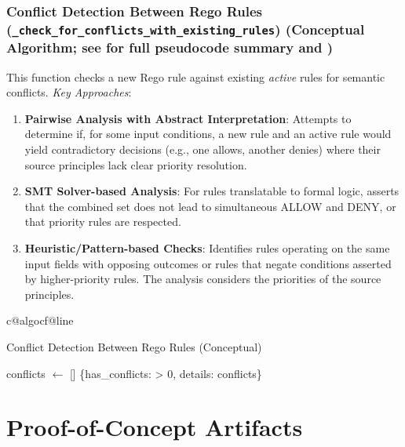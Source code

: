 \documentclass[sigconf,natbib]{acmart}
\makeatletter
\newcommand{\resetalglineno}{\setcounter{ALG@line}{0}}
\renewcommand{\resetalglineno}{%
  \setcounter{ALG@line}{0}%
  \ifcsname c@algocf@line\endcsname\setcounter{algocf@line}{0}\fi%
}
\makeatother
\begin{document}
\subsubsection[Conflict Detection Between Rego Rules]{Conflict Detection Between Rego Rules (\texttt{\_check\_for\_conflicts\_with\_existing\_rules}) (Conceptual Algorithm; see  for full pseudocode summary and )}
\label{app:conflict_detection_subsection}
This function checks a new Rego rule against existing \textit{active} rules for semantic conflicts. \textit{Key Approaches}:
\begin{enumerate}
    \item \textbf{Pairwise Analysis with Abstract Interpretation}: Attempts to determine if, for some input conditions, a new rule and an active rule would yield contradictory decisions (e.g., one allows, another denies) where their source principles lack clear priority resolution.
    \item \textbf{SMT Solver-based Analysis}: For rules translatable to formal logic, asserts that the combined set does not lead to simultaneous ALLOW and DENY, or that priority rules are respected.
    \item \textbf{Heuristic/Pattern-based Checks}: Identifies rules operating on the same input fields with opposing outcomes or rules that negate conditions asserted by higher-priority rules. The analysis considers the priorities of the source principles.
\end{enumerate}

\begin{algorithm}[!htbp]
\resetalglineno
\caption{Conflict Detection Between Rego Rules (Conceptual)}
\label{alg:conflict_detect_conceptual_appendix}
\begin{algorithmic}[1]
  \State conflicts $\gets$ []
      \State {}
    \EndIf
  \EndFor
  \State \Return \{has\_conflicts:  > 0, details: conflicts\}
\EndFunction
\end{algorithmic}
\end{algorithm}

\section{Proof-of-Concept Artifacts}
\label{app:poc_artifacts}
\end{document}
